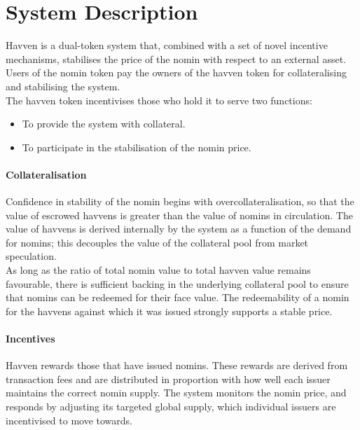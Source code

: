 \section{System Description} Havven is a dual-token system that, combined with a set of novel incentive mechanisms, stabilises the price of the nomin with respect to an external asset. Users of the nomin token pay the owners of the havven token for collateralising and stabilising the system. \\

\noindent The havven token incentivises those who hold it to serve two functions:

\begin{itemize}
\item{To provide the system with collateral.}
\item{To participate in the stabilisation of the nomin price.}
\end{itemize}

\paragraph{Collateralisation}

\noindent Confidence in stability of the nomin begins with overcollateralisation, so that the value of escrowed havvens is greater than the value of nomins in circulation. The value of havvens is derived internally by the system as a function of the demand for nomins; this decouples the value of the collateral pool from market speculation. \\

\noindent As long as the ratio of total nomin value to total havven value remains favourable,
there is sufficient backing in the underlying collateral pool to ensure that nomins
can be redeemed for their face value. The redeemability of a nomin for the havvens
against which it was issued strongly supports a stable price.  

\paragraph{Incentives}

\noindent Havven rewards those that have issued nomins. These rewards are derived from transaction fees and are distributed in proportion with how well each issuer maintains the correct nomin supply. The system monitors the nomin price, and responds by adjusting its targeted global supply, which individual issuers are incentivised to move towards. \\

